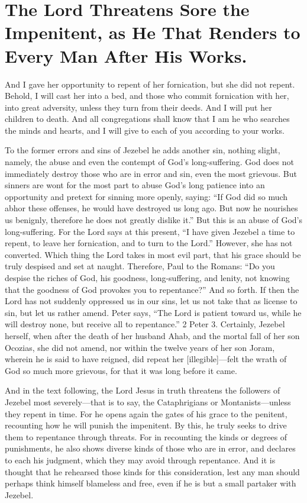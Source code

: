 \chapter[Sermon 13. The Lord Threatens Sore the Impenitent, as He That Renders to Every Man After His Works.]{The Lord Threatens Sore the Impenitent, as He That Renders to Every Man After His Works.}
\label{sermon:013}

And I gave her opportunity to repent of her fornication, but she did not repent. Behold, I will cast her into a bed, and those who commit fornication with her, into great adversity, unless they turn from their deeds. And I will put her children to death. And all congregations shall know that I am he who searches the minds and hearts, and I will give to each of you according to your works.

To the former errors and sins of Jezebel he adds another sin, nothing slight, namely, the abuse and even the contempt of God’s long-suffering. God does not immediately destroy those who are in error and sin, even the most grievous. But sinners are wont for the most part to abuse God’s long patience into an opportunity and pretext for sinning more openly, saying: “If God did so much abhor these offenses, he would have destroyed us long ago. But now he nourishes us benignly, therefore he does not greatly dislike it.” But this is an abuse of God’s long-suffering. For the Lord says at this present, “I have given Jezebel a time to repent, to leave her fornication, and to turn to the Lord.” However, she has not converted. Which thing the Lord takes in most evil part, that his grace should be truly despised and set at naught. Therefore, Paul to the Romans: “Do you despise the riches of God, his goodness, long-suffering, and lenity, not knowing that the goodness of God provokes you to repentance?” And so forth. If then the Lord has not suddenly oppressed us in our sins, let us not take that as license to sin, but let us rather amend. Peter says, “The Lord is patient toward us, while he will destroy none, but receive all to repentance.” 2 Peter 3. Certainly, Jezebel herself, when after the death of her husband Ahab, and the mortal fall of her son Ocozias, she did not amend, nor within the twelve years of her son Joram, wherein he is said to have reigned, did repeat her [illegible]—felt the wrath of God so much more grievous, for that it was long before it came.

And in the text following, the Lord Jesus in truth threatens the followers of Jezebel most severely—that is to say, the Cataphrigians or Montanists—unless they repent in time. For he opens again the gates of his grace to the penitent, recounting how he will punish the impenitent. By this, he truly seeks to drive them to repentance through threats. For in recounting the kinds or degrees of punishments, he also shows diverse kinds of those who are in error, and declares to each his judgment, which they may avoid through repentance. And it is thought that he rehearsed those kinds for this consideration, lest any man should perhaps think himself blameless and free, even if he is but a small partaker with Jezebel.

